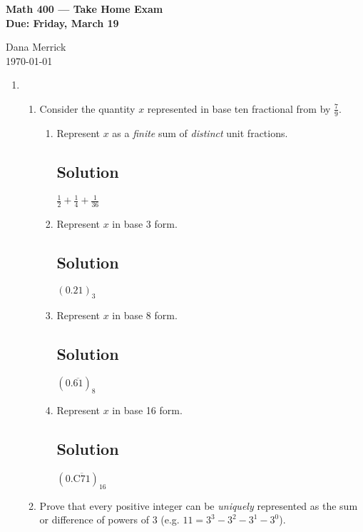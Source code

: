 \documentclass[12pt]{amsart}
\begin{document}
\thispagestyle{empty}

\begin{center}
{\bf Math 400  --- Take Home Exam \\
Due:  Friday, March 19}
\end{center}

\bigskip

\noindent
Dana Merrick \\
\today

\bigskip

\begin{enumerate}\setlength{\itemsep}{6pt}

\item
\begin{enumerate}\setlength{\itemsep}{6pt}

\item Consider the quantity $x$ represented in base ten fractional from by $\frac 7 9$.
\begin{enumerate}\setlength{\itemsep}{6pt}
\item Represent $x$ as a {\it finite} sum of {\it distinct} unit fractions.
\subsection*{Solution}
$\frac 1 2 + \frac 1 4 + \frac 1 {36}$

\item Represent $x$ in base 3 form.
\subsection*{Solution}
$(0.21)_3$

\item Represent $x$ in base 8 form.
\subsection*{Solution}
$(0.\overline{61})_8$

\item Represent $x$ in base 16 form.
\subsection*{Solution}
$(0.\overline{\text{C}71})_{16}$

\end{enumerate}

\item Prove that every positive integer can be {\it uniquely} represented as the sum or difference of powers of 3 (e.g. $11=3^3-3^2-3^1-3^0$).


\end{enumerate}
\end{enumerate}
\end{document}
